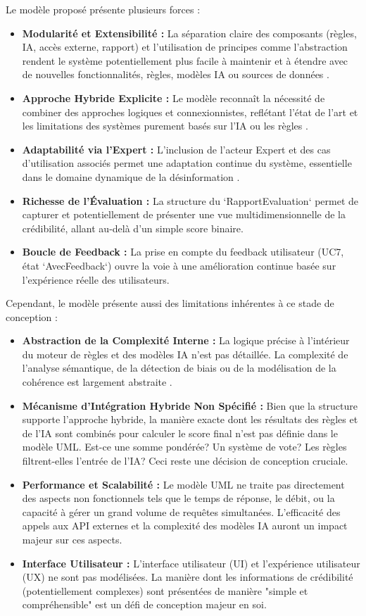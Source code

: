 \documentclass[9pt,twocolumn,french]{article}
\begin{document}
Le modèle proposé présente plusieurs forces :
\begin{itemize}
    \item \textbf{Modularité et Extensibilité :} La séparation claire des composants (règles, IA, accès externe, rapport) et l'utilisation de principes comme l'abstraction rendent le système potentiellement plus facile à maintenir et à étendre avec de nouvelles fonctionnalités, règles, modèles IA ou sources de données \citep{Fowler1998Uml}.
    \item \textbf{Approche Hybride Explicite :} Le modèle reconnaît la nécessité de combiner des approches logiques et connexionnistes, reflétant l'état de l'art et les limitations des systèmes purement basés sur l'IA ou les règles \citep{Ahmed2025Aidriven}.
    \item \textbf{Adaptabilité via l'Expert :} L'inclusion de l'acteur Expert et des cas d'utilisation associés permet une adaptation continue du système, essentielle dans le domaine dynamique de la désinformation \citep{Nabozny2021, Zhou2022A}.
    \item \textbf{Richesse de l'Évaluation :} La structure du `RapportEvaluation` permet de capturer et potentiellement de présenter une vue multidimensionnelle de la crédibilité, allant au-delà d'un simple score binaire.
    \item \textbf{Boucle de Feedback :} La prise en compte du feedback utilisateur (UC7, état `AvecFeedback`) ouvre la voie à une amélioration continue basée sur l'expérience réelle des utilisateurs.
\end{itemize}

Cependant, le modèle présente aussi des limitations inhérentes à ce stade de conception :
\begin{itemize}
    \item \textbf{Abstraction de la Complexité Interne :} La logique précise à l'intérieur du moteur de règles et des modèles IA n'est pas détaillée. La complexité de l'analyse sémantique, de la détection de biais ou de la modélisation de la cohérence est largement abstraite \citep{Fowler1998Uml}.
    \item \textbf{Mécanisme d'Intégration Hybride Non Spécifié :} Bien que la structure supporte l'approche hybride, la manière exacte dont les résultats des règles et de l'IA sont combinés pour calculer le score final n'est pas définie dans le modèle UML. Est-ce une somme pondérée? Un système de vote? Les règles filtrent-elles l'entrée de l'IA? Ceci reste une décision de conception cruciale.
    \item \textbf{Performance et Scalabilité :} Le modèle UML ne traite pas directement des aspects non fonctionnels tels que le temps de réponse, le débit, ou la capacité à gérer un grand volume de requêtes simultanées. L'efficacité des appels aux API externes et la complexité des modèles IA auront un impact majeur sur ces aspects.
    \item \textbf{Interface Utilisateur :} L'interface utilisateur (UI) et l'expérience utilisateur (UX) ne sont pas modélisées. La manière dont les informations de crédibilité (potentiellement complexes) sont présentées de manière "simple et compréhensible" est un défi de conception majeur en soi.
\end{itemize}
\end{document}
